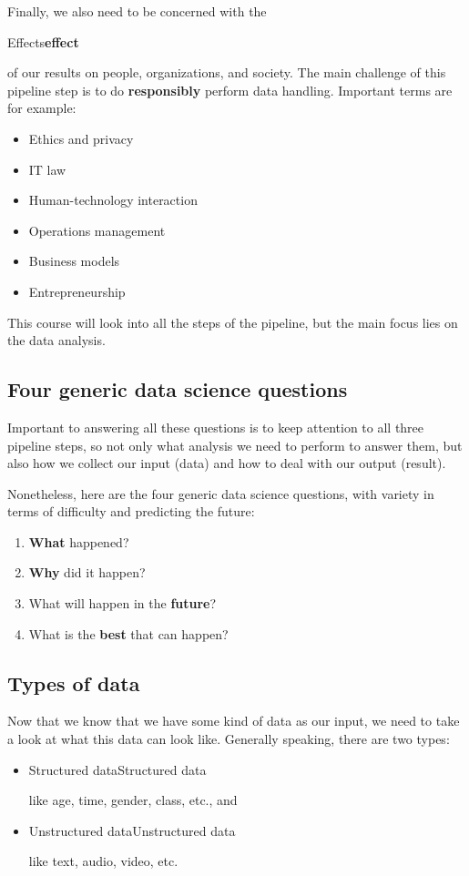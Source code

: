 Finally, we also need to be concerned with the \begin{sidenote}{Effects}\textbf{effect}\end{sidenote} of our results on people, organizations, and society. The main challenge of this pipeline step is to do \textbf{responsibly} perform data handling. Important terms are for example:
\begin{itemize}
  \item Ethics and privacy
  \item IT law
  \item Human-technology interaction
  \item Operations management
  \item Business models
  \item Entrepreneurship
\end{itemize}

This course will look into all the steps of the pipeline, but the main focus lies on the data analysis.


\subsection{Four generic data science questions}
Important to answering all these questions is to keep attention to all three pipeline steps, so not only what analysis we need to perform to answer them, but also how we collect our input (data) and how to deal with our output (result).

Nonetheless, here are the four generic data science questions, with variety in terms of difficulty and predicting the future:
\begin{enumerate}
  \item \textbf{What} happened?
  \item \textbf{Why} did it happen?
  \item What will happen in the \textbf{future}?
  \item What is the \textbf{best} that can happen?
\end{enumerate}


\subsection{Types of data}
Now that we know that we have some kind of data as our input, we need to take a look at what this data can look like. Generally speaking, there are two types:
\begin{itemize}
  \item \begin{sidenote}{Structured data}Structured data\end{sidenote} like age, time, gender, class, etc., and
  \item \begin{sidenote}{Unstructured data}Unstructured data\end{sidenote} like text, audio, video, etc.
\end{itemize}

